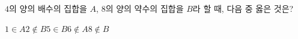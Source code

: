 $4$의 양의 배수의 집합을 $A$, $8$의 양의 약수의 집합을 $B$라 할 때, 다음 중 옳은 것은?
\begin{choices32}{$1\in A$}{$2\notin B$}{$5\in B$}{$6\notin A$}{$8\notin B$}\end{choices32}
